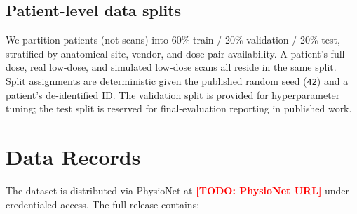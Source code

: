 \documentclass[twoside,11pt]{article}
\newcommand{\todo}[1]{\textcolor{red}{\textbf{[TODO: #1]}}}
\begin{document}
\subsection*{Patient-level data splits}

We partition patients (not scans) into 60\% train / 20\% validation / 20\% test, stratified by anatomical site, vendor, and dose-pair availability. A patient's full-dose, real low-dose, and simulated low-dose scans all reside in the same split. Split assignments are deterministic given the published random seed (\texttt{42}) and a patient's de-identified ID. The validation split is provided for hyperparameter tuning; the test split is reserved for final-evaluation reporting in published work.

\section*{Data Records}

The dataset is distributed via PhysioNet at \todo{PhysioNet URL} under credentialed access. The full release contains:
\end{document}
